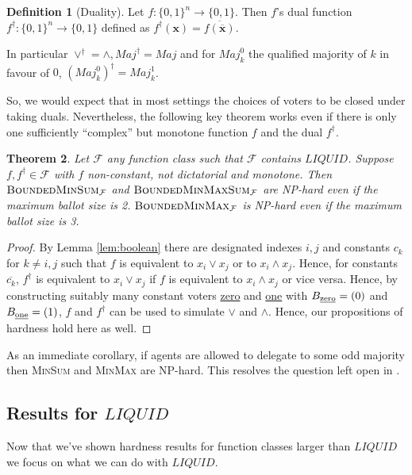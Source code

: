 \documentclass[11pt,a4paper, titlepage]{article}
\newtheorem{theorem}{Theorem}
\theoremstyle{definition}
\newtheorem{definition}[theorem]{Definition}
\let\vec\mathbf
\newcommand{\BMM}{\textsc{BoundedMinMax}}
\newcommand{\BMS}{\textsc{BoundedMinSum}}
\newcommand{\BMMS}{\textsc{BoundedMinMaxSum}}
\newcommand{\Maj}{\mathit{Maj}}
\newcommand{\LIQUID}{\mathit{LIQUID}}
\begin{document}
\begin{definition}[Duality]
    Let $f \colon \{0, 1\}^n \longrightarrow \{0, 1\}$. Then $f$'s dual function $f^\dagger \colon \{0, 1\}^n \longrightarrow \{0, 1\}$ defined as $f^\dagger(\vec{x}) = \overline{f(\overline{\vec{x}})}$.
\end{definition}

In particular $\lor^\dagger = \land,\Maj^\dagger= \Maj$ and for $\Maj_k^0$ the qualified majority of $k$ in favour of $0$, $(\Maj_k^0)^\dagger = \Maj_k^1$.

So, we would expect that in most settings the choices of voters to be closed under taking duals.
Nevertheless, the following key theorem works even if there is only one sufficiently ``complex'' but monotone function $f$ and the dual $f^\dagger$.

\begin{theorem}
    Let $\mathcal{F}$ any function class such that $\mathcal{F}$ contains $\LIQUID$. Suppose $f, f^\dagger \in \mathcal{F}$ with $f$ non-constant, not dictatorial and monotone.
    Then $\BMS_\mathcal{F}$ and $\BMMS_\mathcal{F}$ are NP-hard even if the maximum ballot size is 2. $\BMM_{\mathcal{F}}$ is NP-hard even if the maximum ballot size is 3.
\end{theorem}

\begin{proof}
    By Lemma \ref{lem:boolean} there are designated indexes $i, j$ and constants $c_k$ for $k \neq i, j$ such that $f$ is equivalent to $x_i \lor x_j$ or to $x_i \land x_j$.
    Hence, for constants $\overline{c_k}$, $f^\dagger$ is equivalent to $x_i \lor x_j$ if $f$ is equivalent to $x_i \land x_j$ or vice versa.
    Hence, by constructing suitably many constant voters \underline{zero} and \underline{one} with $B_{\text{\underline{zero}}} = (0)$ and $B_{\text{\underline{one}}} = (1)$, $f$ and $f^\dagger$ can be used to simulate $\lor$ and $\land$.
    Hence, our propositions of hardness hold here as well.
\end{proof}

As an immediate corollary, if agents are allowed to delegate to some odd majority then \textsc{MinSum} and \textsc{MinMax} are NP-hard.
This resolves the question left open in \citet{grandi}.

\subsection{Results for $\LIQUID$}

Now that we've shown hardness results for function classes larger than $\LIQUID$ we focus on what we can do with $\LIQUID$.
\end{document}
